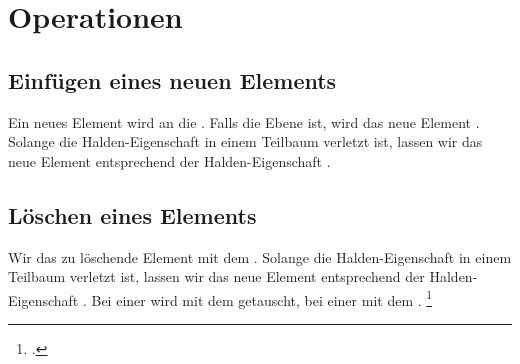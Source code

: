 \documentclass{lehramt-informatik-haupt}
\begin{document}
\begin{center}
\end{center}

%

\section{Operationen}

%

\subsection{Einfügen eines neuen Elements}

Ein neues Element wird an die . Falls die Ebene  ist, wird das
neue Element . Solange die
Halden-Eigenschaft in einem Teilbaum verletzt ist, lassen wir das neue
Element entsprechend der Halden-Eigenschaft .

%

\subsection{Löschen eines Elements}

Wir  das zu löschende Element mit dem .
%
Solange die Halden-Eigenschaft in einem Teilbaum verletzt ist, lassen
wir das neue Element entsprechend der Halden-Eigenschaft .
%
Bei einer  wird mit dem 
getauscht, bei einer  mit dem .
\footcite[Seite 28]{aud:fs:tafeluebung-11}


\literatur
\end{document}
